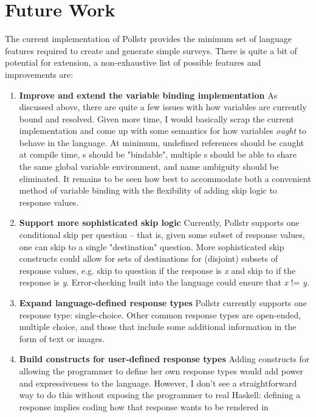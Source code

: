 \documentclass[pldi]{sigplanconf-pldi15}
\begin{document}
\section{Future Work}\label{sec:future}
The current implementation of Pollstr provides the minimum set of language 
features required to create and generate simple surveys. There is quite a bit
of potential for extension, a non-exhaustive list of possible features and 
improvements are:

\begin{enumerate}
  \item \textbf{Improve and extend the variable binding implementation} 
  As discussed above, there are quite a few issues with how variables are currently bound and resolved.
  Given more time, I would basically scrap the current implementation and 
  come up with some semantics for how variables \textit{ought} to behave in the language.
  At minimum, undefined references should be caught at compile time, 
  s should be "bindable", multiple s should
  be able to share the same global variable environment, and name ambiguity 
  should be eliminated. It remains to be seen how best to accommodate both a 
  convenient method of variable binding with the flexibility of adding skip logic
  to response values.
  \item \textbf{Support more sophisticated skip logic} Currently, Pollstr 
  supports one conditional skip per question -- that is, given some subset of
  response values, one can skip to a single "destination" question. More 
  sophisticated skip constructs could allow for sets of destinations for (disjoint)
  subsets of response values, e.g. skip to question  if the response 
  is \textit{x} and skip to  if the response is \textit{y}. Error-checking 
  built into the language could ensure that \textit{x} != \textit{y}.
  \item \textbf{Expand language-defined response types} Pollstr currently
  supports one response type: single-choice. 
  Other common response types are open-ended, multiple choice, and
  those that include some additional information in the form of text or images.
  \item \textbf{Build constructs for user-defined response types} Adding 
  constructs for allowing the programmer to define her own response types
  would add power and expressiveness to the language. However, I don't see
  a straightforward way to do this without exposing the programmer to real Haskell: 
  defining a response implies coding how that response wants to be rendered in 

\end{enumerate}
\end{document}
